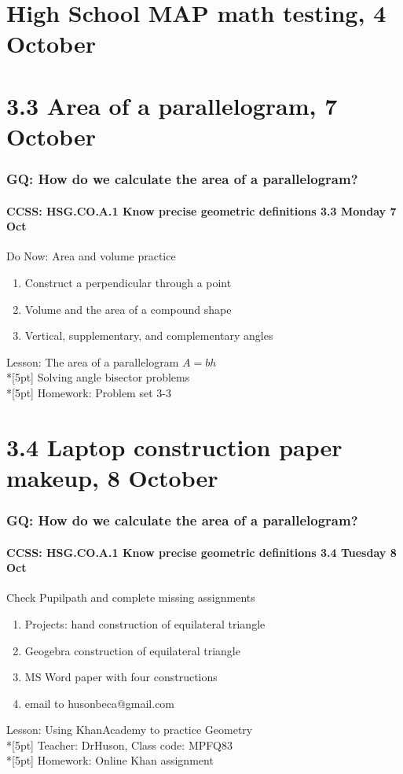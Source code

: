 \documentclass{beamer}
\begin{document}
\section{High School MAP math testing, 4 October}

\section{3.3 Area of a parallelogram, 7 October}
  \frame
  {
    \frametitle{GQ: How do we calculate the area of a parallelogram?}
    \framesubtitle{CCSS: HSG.CO.A.1 Know precise geometric definitions \hfill \alert{3.3 Monday 7 Oct}}

    \begin{block}{Do Now: Area and volume practice}
    \begin{enumerate}
      \item Construct a perpendicular through a point
      \item Volume and the area of a compound shape
      \item Vertical, supplementary, and complementary angles
    \end{enumerate}
    \end{block}
    Lesson: The area of a parallelogram $A=bh$\\*[5pt]
    Solving angle bisector problems\\*[5pt]
    Homework: Problem set 3-3
  }

\section{3.4 Laptop construction paper makeup, 8 October}
  \frame
  {
    \frametitle{GQ: How do we calculate the area of a parallelogram?}
    \framesubtitle{CCSS: HSG.CO.A.1 Know precise geometric definitions \hfill \alert{3.4 Tuesday 8 Oct}}

    \begin{block}{Check Pupilpath and complete missing assignments}
    \begin{enumerate}
      \item Projects: hand construction of equilateral triangle
      \item Geogebra construction of equilateral triangle
      \item MS Word paper with four constructions
      \item email to husonbeca@gmail.com
    \end{enumerate}
    \end{block}
    Lesson: Using KhanAcademy to practice Geometry \\*[5pt]
    Teacher: DrHuson, Class code: MPFQ83\\*[5pt]
    Homework: Online Khan assignment
  }
\end{document}
